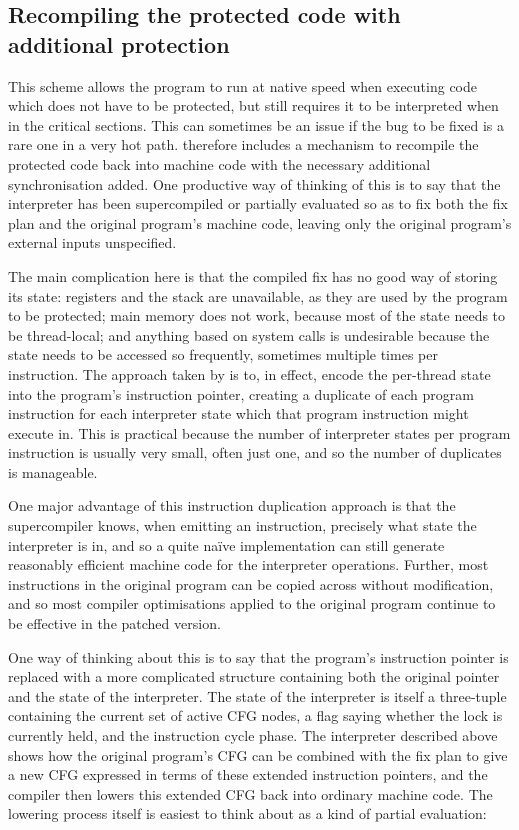 \subsection{Recompiling the protected code with additional protection}

This scheme allows the program to run at native speed when executing
code which does not have to be protected, but still requires it to be
interpreted when in the critical sections.  This can sometimes be an
issue if the bug to be fixed is a rare one in a very hot path.
{\Implementation} therefore includes a mechanism to recompile the
protected code back into machine code with the necessary additional
synchronisation added.  One productive way of thinking of this is to
say that the interpreter has been supercompiled or partially evaluated
so as to fix both the fix plan and the original program's machine
code, leaving only the original program's external inputs unspecified.

The main complication here is that the compiled fix has no good way of
storing its state: registers and the stack are unavailable, as they
are used by the program to be protected; main memory does not work,
because most of the state needs to be thread-local; and anything based
on system calls is undesirable because the state needs to be accessed
so frequently, sometimes multiple times per instruction.  The approach
taken by {\implementation} is to, in effect, encode the per-thread
state into the program's instruction pointer, creating a duplicate of
each program instruction for each interpreter state which that program
instruction might execute in.  This is practical because the number of
interpreter states per program instruction is usually very small,
often just one, and so the number of duplicates is manageable.

One major advantage of this instruction duplication approach is that
the supercompiler knows, when emitting an instruction, precisely what
state the interpreter is in, and so a quite na\"ive implementation can
still generate reasonably efficient machine code for the interpreter
operations.  Further, most instructions in the original program can be
copied across without modification, and so most compiler optimisations
applied to the original program continue to be effective in the
patched version.

One way of thinking about this is to say that the program's
instruction pointer is replaced with a more complicated structure
containing both the original pointer and the state of the interpreter.
The state of the interpreter is itself a three-tuple containing the
current set of active CFG nodes, a flag saying whether the lock is
currently held, and the instruction cycle phase.  The interpreter
described above shows how the original program's CFG can be combined
with the fix plan to give a new CFG expressed in terms of these
extended instruction pointers, and the compiler then lowers this
extended CFG back into ordinary machine code.  The lowering process
itself is easiest to think about as a kind of partial evaluation:

